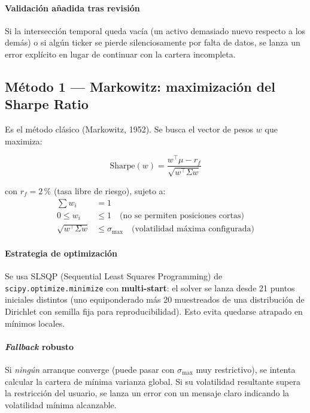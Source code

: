 \documentclass[11pt,a4paper]{article}
\begin{document}
\paragraph{Validación añadida tras revisión}
Si la intersección temporal queda vacía (un activo demasiado nuevo respecto a los demás) o si algún ticker se pierde silenciosamente por falta de datos, se lanza un error explícito en lugar de continuar con la cartera incompleta.

\subsection{Método 1 — Markowitz: maximización del Sharpe Ratio}

Es el método clásico (Markowitz, 1952). Se busca el vector de pesos $w$ que maximiza:

\begin{equation}
\mathrm{Sharpe}(w) = \frac{w^\top\mu - r_f}{\sqrt{w^\top \Sigma w}}
\end{equation}

con $r_f = 2\,\%$ (tasa libre de riesgo), sujeto a:
\begin{align}
\sum w_i &= 1 \\
0 \le w_i &\le 1 \quad \text{(no se permiten posiciones cortas)} \\
\sqrt{w^\top \Sigma w} &\le \sigma_{\max} \quad \text{(volatilidad máxima configurada)}
\end{align}

\paragraph{Estrategia de optimización}
Se usa SLSQP (Sequential Least Squares Programming) de \texttt{scipy.optimize.minimize} con \textbf{multi-start}: el solver se lanza desde 21 puntos iniciales distintos (uno equiponderado más 20 muestreados de una distribución de Dirichlet con semilla fija para reproducibilidad). Esto evita quedarse atrapado en mínimos locales.

\paragraph{\textit{Fallback} robusto}
Si \textit{ningún} arranque converge (puede pasar con $\sigma_{\max}$ muy restrictivo), se intenta calcular la cartera de mínima varianza global. Si su volatilidad resultante supera la restricción del usuario, se lanza un error con un mensaje claro indicando la volatilidad mínima alcanzable.
\end{document}
